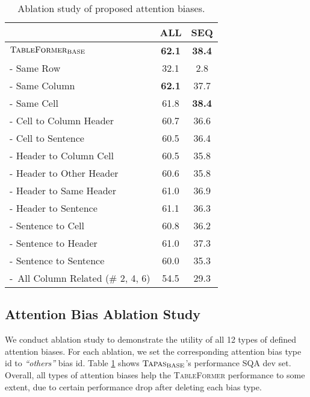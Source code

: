 \documentclass[11pt]{article}
\begin{document}
\begin{table}[t!]

\centering
\small
\begin{tabularx}{\linewidth}{Xcc}
\toprule
     & ALL       & SEQ       \\ \midrule
 $\textsc{TableFormer}_{\text{BASE}}$              & \textbf{62.1} & \textbf{38.4} \\\midrule
 - Same Row              & 32.1          & 2.8           \\
 - Same Column          & \textbf{62.1} & 37.7          \\
 - Same Cell            & 61.8          & \textbf{38.4} \\
 - Cell to Column Header & 60.7          & 36.6          \\
 - Cell to Sentence          & 60.5          & 36.4          \\
 -  Header to Column Cell & 60.5          & 35.8          \\
 - Header to Other Header    & 60.6          & 35.8          \\
 - Header to Same Header     & 61.0          & 36.9          \\
 - Header to Sentence        & 61.1          & 36.3          \\
 - Sentence to Cell          & 60.8          & 36.2          \\
 - Sentence to Header        & 61.0          & 37.3          \\
 - Sentence to Sentence      & 60.0          & 35.3          \\
 -~All Column Related (\# 2, 4, 6)  &  54.5          & 29.3          \\
\bottomrule
\end{tabularx}
\caption{\label{tab:widgets7}Ablation study of proposed attention biases.}
\vspace{-1em}
\end{table}

\subsection{Attention Bias Ablation Study}

We conduct ablation study to demonstrate the utility of all 12 types of defined attention biases. For each ablation, we set the corresponding attention bias type id to \emph{``others''} bias id. Table \ref{tab:widgets7} shows $\textsc{Tapas}_{\text{BASE}}$'s performance SQA dev set. Overall, all types of attention biases help the \textsc{TableFormer} performance to some extent, due to certain performance drop after deleting each bias type. 
\end{document}
